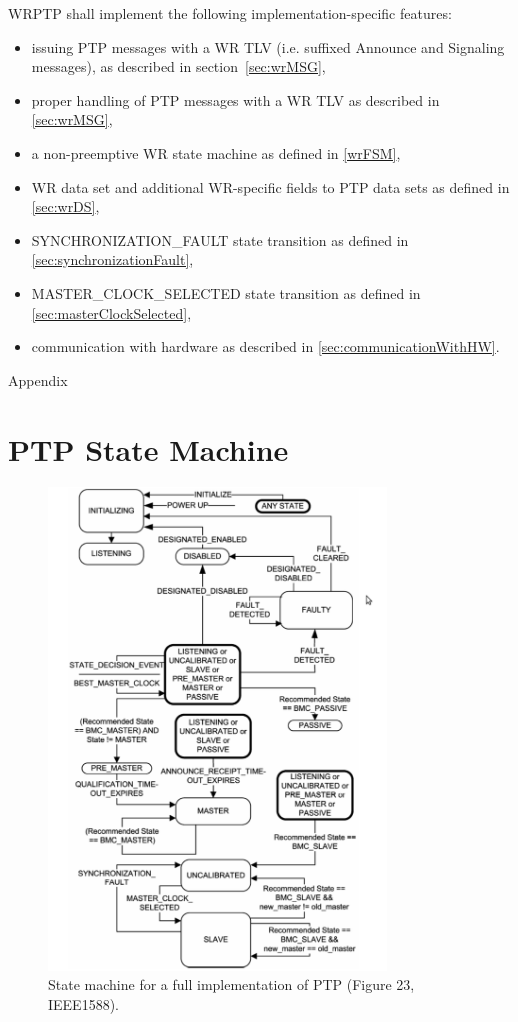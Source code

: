 \documentclass[a4paper, 12pt]{article}
\begin{document}
WRPTP shall implement the following implementation-specific features:
\begin{itemize}
  \item issuing PTP messages with a WR TLV (i.e. suffixed Announce and Signaling messages),
	as described in section~\ref{sec:wrMSG},
  \item proper handling of PTP messages with a WR TLV as described in \ref{sec:wrMSG},
  \item a non-preemptive WR state machine as defined in \ref{wrFSM},
  \item WR data set and additional WR-specific fields to PTP data sets as defined in 
	\ref{sec:wrDS},
  \item SYNCHRONIZATION\_FAULT state transition as defined in \ref{sec:synchronizationFault},
  \item MASTER\_CLOCK\_SELECTED state transition as defined in \ref{sec:masterClockSelected},
  \item communication with hardware as described in \ref{sec:communicationWithHW}.
\end{itemize}


\newpage
\begin{center}
\huge Appendix
\end{center} 

\normalsize
\appendix
\section{PTP State Machine}
\label{ptpFSM}

 \begin{figure}[ht!]
   \centering
   \includegraphics[width=0.8\textwidth]{protocol/ptpFSM.pdf}
   \caption{State machine for a full implementation of PTP (Figure 23, IEEE1588).}
   \label{fig:ptpFSM}
 \end{figure}
 
\end{document}
